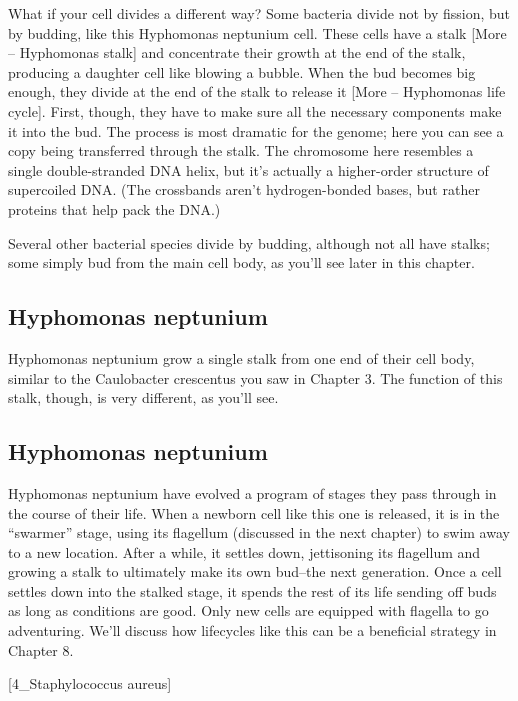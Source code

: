 \documentclass[]{tufte-book}
\begin{document}
What if your cell divides a different way? Some bacteria divide not by
fission, but by budding, like this Hyphomonas neptunium cell. These
cells have a stalk {[}More -- Hyphomonas stalk{]} and concentrate their
growth at the end of the stalk, producing a daughter cell like blowing a
bubble. When the bud becomes big enough, they divide at the end of the
stalk to release it {[}More -- Hyphomonas life cycle{]}. First, though,
they have to make sure all the necessary components make it into the
bud. The process is most dramatic for the genome; here you can see a
copy being transferred through the stalk. The chromosome here resembles
a single double-stranded DNA helix, but it's actually a higher-order
structure of supercoiled DNA. (The crossbands aren't hydrogen-bonded
bases, but rather proteins that help pack the DNA.)

Several other bacterial species divide by budding, although not all have
stalks; some simply bud from the main cell body, as you'll see later in
this chapter.

\subsection{Hyphomonas neptunium}\label{Hyphomonas_stalk}

Hyphomonas neptunium grow a single stalk from one end of their cell
body, similar to the Caulobacter crescentus you saw in Chapter 3. The
function of this stalk, though, is very different, as you'll see.

\subsection{Hyphomonas neptunium}\label{Hyphomonas_life_cycle}

Hyphomonas neptunium have evolved a program of stages they pass through
in the course of their life. When a newborn cell like this one is
released, it is in the ``swarmer'' stage, using its flagellum (discussed
in the next chapter) to swim away to a new location. After a while, it
settles down, jettisoning its flagellum and growing a stalk to
ultimately make its own bud--the next generation. Once a cell settles
down into the stalked stage, it spends the rest of its life sending off
buds as long as conditions are good. Only new cells are equipped with
flagella to go adventuring. We'll discuss how lifecycles like this can
be a beneficial strategy in Chapter 8.

{[}4\_Staphylococcus aureus{]}
\end{document}
